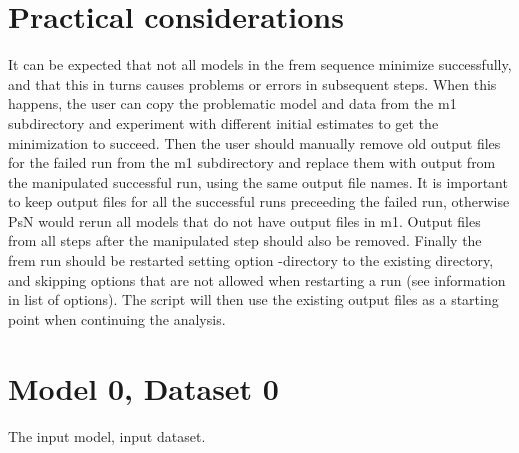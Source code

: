 \section{Practical considerations}
It can be expected that not all models in the frem sequence minimize successfully, and that this in turns 
causes problems or errors in subsequent steps. 
When this happens, the user can copy the problematic model and data from the m1 subdirectory and experiment with
different initial estimates to get the minimization to succeed. Then the user should manually remove old output files for the
failed run from the m1 subdirectory and replace them with output from the manipulated successful run, using the same 
output file names. It is important to keep output files for all the successful runs preceeding the failed run, 
otherwise PsN would rerun all models that do not have output files
in m1. Output files from all steps after the manipulated step should also be removed.
Finally the frem run should be restarted setting option -directory to the existing directory, and skipping 
options that are not allowed when restarting a run (see information in list of options). The script
will then use the existing output files as a starting point when continuing the analysis.


\section{Model 0, Dataset 0}
The input model, input dataset.

